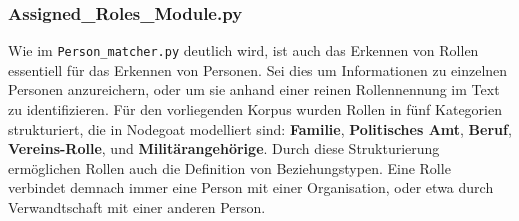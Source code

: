 \documentclass[12pt, a4paper, ngerman, bidi=default]{article}
\newcommand{\code}[1]{\colorbox{VeryLightGray}{\texttt{#1}}} %
\begin{document}
\newpage
\begin{minipage}[t]{0.38\textwidth}
  \justifying%

  \subsubsection{Assigned\_Roles\_Module.py}\label{subsection:assigned_roles_module}

      Wie im \code{Person\_matcher.py} deutlich wird, ist auch das Erkennen von Rollen essentiell für das Erkennen von Personen. Sei dies um Informationen zu einzelnen Personen anzureichern, oder um sie anhand einer reinen Rollennennung im Text zu identifizieren. Für den vorliegenden Korpus wurden Rollen in fünf Kategorien strukturiert, die in Nodegoat modelliert sind: \textbf{Familie}, \textbf{Politisches Amt}, \textbf{Beruf}, \textbf{Vereins-Rolle}, und \textbf{Militärangehörige}. Durch diese Strukturierung ermöglichen Rollen auch die Definition von Beziehungstypen. Eine Rolle verbindet demnach immer eine Person mit einer Organisation,\footnotemark{} oder etwa durch Verwandtschaft mit einer anderen Person. 

  \end{minipage}%
  \hfill
\end{document}
